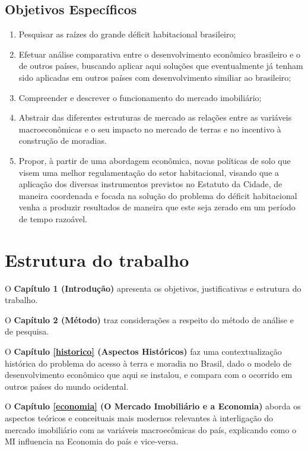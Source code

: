 \documentclass[
	12pt,				%
	oneside,			%
	a4paper,			%
	chapter=TITLE,		%
	section=TITLE,		%
	english,			%
	brazil				%
	]{abntex2}
\begin{document}
\hypertarget{objetivos-especuxedficos}{%
\subsection{Objetivos Específicos}\label{objetivos-especuxedficos}}
\begin{enumerate}
\def\labelenumi{\arabic{enumi}.}
\tightlist
\item
  Pesquisar as raízes do grande déficit habitacional brasileiro;
\item
  Efetuar análise comparativa entre o desenvolvimento econômico brasileiro e o
  de outros países, buscando aplicar aqui soluções que eventualmente já tenham
  sido aplicadas em outros países com desenvolvimento similiar ao brasileiro;
\item
  Compreender e descrever o funcionamento do mercado imobiliário;
\item
  Abstrair das diferentes estruturas de mercado as relações entre as variáveis
  macroeconômicas e o seu impacto no mercado de terras e no incentivo à construção
  de moradias.
\item
  Propor, à partir de uma abordagem econômica, novas políticas de solo que
  visem uma melhor regulamentação do setor habitacional, visando que a aplicação
  dos diversas instrumentos previstos no Estatuto da Cidade, de maneira coordenada
  e focada na solução do problema do déficit habitacional venha a produzir
  resultados de maneira que este seja zerado em um período de tempo razoável.
\end{enumerate}
\hypertarget{estrutura-do-trabalho}{%
\section{Estrutura do trabalho}\label{estrutura-do-trabalho}}

O \textbf{Capítulo 1 (Introdução)} apresenta os objetivos, justificativas e
estrutura do trabalho.

O \textbf{Capítulo 2 (Método)} traz considerações a respeito do método de análise e
de pesquisa.

O \textbf{Capítulo \ref{historico} (Aspectos Históricos)} faz uma contextualização histórica do
problema do acesso à terra e moradia no Brasil, dado o modelo de desenvolvimento
econômico que aqui se instalou, e compara com o ocorrido em outros países do
mundo ocidental.

O \textbf{Capítulo \ref{economia} (O Mercado Imobiliário e a Economia)} aborda os aspectos
teóricos e conceituais mais modernos relevantes à interligação do mercado
imobiliário com as variáveis macroecômicas do país, explicando como o \gls{MI}
influencia na Economia do país e vice-versa.
\end{document}
